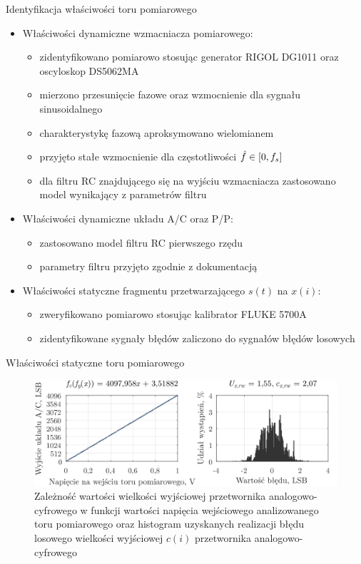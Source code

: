 \documentclass[12pt, polish, aspectratio = 169]{beamer}
\begin{document}
\begin{frame}{Identyfikacja właściwości toru pomiarowego}
\begin{itemize}
\item Właściwości dynamiczne wzmacniacza pomiarowego:
	\begin{itemize}
	\item zidentyfikowano pomiarowo stosując generator RIGOL DG1011 oraz oscyloskop DS5062MA
	\item mierzono przesunięcie fazowe oraz wzmocnienie dla sygnału sinusoidalnego
	\item charakterystykę fazową aproksymowano wielomianem
	\item przyjęto stałe wzmocnienie dla częstotliwości $\hat{f} \in \interval{0}{f_{s}}$
	\item dla filtru RC znajdującego się na wyjściu wzmacniacza zastosowano model wynikający z parametrów filtru
	\end{itemize}
\item Właściwości dynamiczne układu A/C oraz P/P:
	\begin{itemize}
	\item zastosowano model filtru RC pierwszego rzędu
	\item parametry filtru przyjęto zgodnie z dokumentacją 
	\end{itemize}
\item Właściwości statyczne fragmentu przetwarzającego $s(t)$ na $x(i)$:
	\begin{itemize}
	\item zweryfikowano pomiarowo stosując kalibrator FLUKE 5700A
	\item zidentyfikowane sygnały błędów zaliczono do sygnałów błędów losowych
	\end{itemize}
\end{itemize}
\end{frame}

\begin{frame}{Właściwości statyczne toru pomiarowego}
\begin{figure}
\begin{center}
\includegraphics[scale = 0.75]{obrazki/static_adcout}
\caption{Zależność wartości wielkości wyjściowej przetwornika analogowo-cyfrowego w funkcji wartości napięcia wejściowego analizowanego toru pomiarowego oraz histogram uzyskanych realizacji błędu losowego wielkości wyjściowej $c(i)$ przetwornika analogowo-cyfrowego}
\label{fig:pom_static_fun}
\end{center}
\end{figure}
\end{frame}
\end{document}
